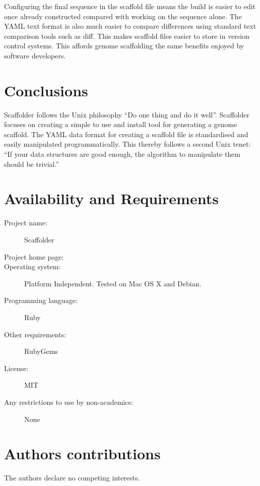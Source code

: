 \documentclass[10pt]{bmc_article}
\newenvironment{bmcformat}{\begin{raggedright}\baselineskip20pt\sloppy\setboolean{publ}{false}}{\end{raggedright}\baselineskip20pt\sloppy}
\begin{document}
\begin{bmcformat}
Configuring the final sequence in the scaffold file means the build is easier
to edit once already constructed compared with working on the sequence alone.
The YAML text format is also much easier to compare differences using standard
text comparison tools such as diff. This makes scaffold files easier to store
in version control systems. This affords genome scaffolding the same benefits
enjoyed by software developers. \pb 

\clearpage

\section*{Conclusions} %

Scaffolder follows the Unix philosophy ``Do one thing and do it well''.
Scaffolder focuses on creating a simple to use and install tool for generating
a genome scaffold. The YAML data format for creating a scaffold file is
standardised and easily manipulated programmatically. This thereby follows
a second Unix tenet: ``If your data structures are good enough, the algorithm
to manipulate them should be trivial.''

\clearpage

\section*{Availability and Requirements} %

  \begin{description}
    \item[Project name:] Scaffolder
    \item[Project home page:] \scaffolder
    \item[Operating system:] Platform Independent. Tested on Mac OS X and
    Debian.
    \item[Programming language:] Ruby
    \item[Other requirements:] RubyGems
    \item[License:] MIT
    \item[Any restrictions to use by non-academics:] None
  \end{description}

\clearpage

\section*{Authors contributions} %
  The authors declare no competing interests.


\end{bmcformat}
\end{document}
